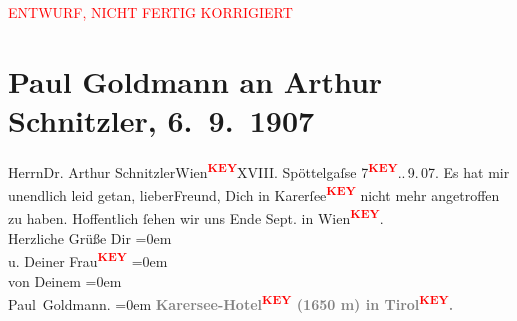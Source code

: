 
\begin{center}
            \textcolor{red}{ENTWURF, NICHT FERTIG KORRIGIERT}
                      \end{center}
            
         \renewcommand{\erwaehnteOrte}{Orte: Berlin, Wien}
         \renewcommand{\erwaehnteWerke}{}
               \section[Paul Goldmann an Arthur Schnitzler, 6. 9. 1907]{ Paul Goldmann an Arthur Schnitzler, 6. 9. 1907}\nopagebreak{}\rehead{ }\begin{ledgroupsized}[t]{13cm}\normalsize\beginnumbering \toendnotes[C]{\smallbreak\pagebreak[2]} 
\pstart{} Herrn\pend{}\pstart{}Dr. Arthur Schnitzler\pend{}\pstart{}Wien\textcolor{red}{\textsuperscript{\textbf{KEY}}}\pend{}\pstart{}XVIII. Spöttelgaſse 7\textcolor{red}{\textsuperscript{\textbf{KEY}}}.\pend{}. 9. 07. \pend
           \pstart
           Es hat mir unendlich leid getan, lieberFreund, Dich in Karerſee\textcolor{red}{\textsuperscript{\textbf{KEY}}} nicht mehr
               angetroffen zu haben. Hoffentlich ſehen wir uns Ende Sept. in Wien\textcolor{red}{\textsuperscript{\textbf{KEY}}}. {\\[\baselineskip]}Herzliche Grüße Dir\pend
           \leftskip=0em{}\pstart
           {\\[\baselineskip]}u. Deiner Frau\textcolor{red}{\textsuperscript{\textbf{KEY}}}\pend
           \leftskip=0em{}\pstart
           {\\[\baselineskip]}von Deinem\pend
           \leftskip=0em{}\pstart
           {\\[\baselineskip]}\spacefill\mbox{Paul Goldmann.}\pend
           \leftskip=0em{}\pstart
           {\pb}\pend
           \pstart
           \textcolor{gray}{\textbf{Karersee-Hotel\textcolor{red}{\textsuperscript{\textbf{KEY}}} (1650 m) in Tirol\textcolor{red}{\textsuperscript{\textbf{KEY}}}. }}\pend
           
         
         \endnumbering{}\end{ledgroupsized}\begin{anhang}\end{anhang}\newcommand{\dateiname}{L03258}\newcommand{\titel}{Paul Goldmann an Arthur Schnitzler, 6. 9. 1907}\newcommand{\editorInnen}{Martin Anton Müller und Laura Untner}
      